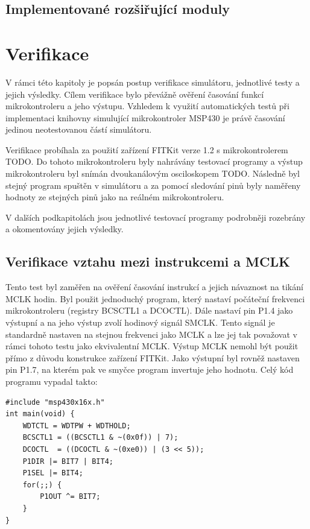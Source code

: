 \section{Implementované rozšiřující moduly}

\chapter{Verifikace}

V rámci této kapitoly je popsán postup verifikace simulátoru, jednotlivé testy a jejich výsledky. Cílem verifikace bylo převážně ověření časování funkcí mikrokontroleru a jeho výstupu. Vzhledem k využití automatických testů při implementaci knihovny simulující mikrokontroler MSP430 je právě časování jedinou neotestovanou částí simulátoru.

Verifikace probíhala za použití zařízení FITKit verze 1.2 s mikrokontrolerem TODO. Do tohoto mikrokontroleru byly nahrávány testovací programy a výstup mikrokontroleru byl snímán dvoukanálovým osciloskopem TODO. Následně byl stejný program spuštěn v simulátoru a za pomocí sledování pinů byly naměřeny hodnoty ze stejných pinů jako na reálném mikrokontroleru.

V dalších podkapitolách jsou jednotlivé testovací programy podrobněji rozebrány a okomentovány jejich výsledky.

\section{Verifikace vztahu mezi instrukcemi a MCLK}

Tento test byl zaměřen na ověření časování instrukcí a jejich návaznost na tikání MCLK hodin. Byl použit jednoduchý program, který nastaví počáteční frekvenci mikrokontroleru (registry BCSCTL1 a DCOCTL). Dále nastaví pin P1.4 jako výstupní a na jeho výstup zvolí hodinový signál SMCLK. Tento signál je standardně nastaven na stejnou frekvenci jako MCLK a lze jej tak považovat v rámci tohoto testu jako ekvivalentní MCLK. Výstup MCLK nemohl být použit přímo z důvodu konstrukce zařízení FITKit. Jako výstupní byl rovněž nastaven pin P1.7, na kterém pak ve smyčce program invertuje jeho hodnotu. Celý kód programu vypadal takto:

\lstset{language=XML, numbers=left, frame=single, breaklines=true, tabsize=2, xleftmargin=20pt}
\begin{lstlisting}
#include "msp430x16x.h"
int main(void) {
	WDTCTL = WDTPW + WDTHOLD;
	BCSCTL1 = ((BCSCTL1 & ~(0x0f)) | 7);
	DCOCTL  = ((DCOCTL & ~(0xe0)) | (3 << 5));
	P1DIR |= BIT7 | BIT4;
	P1SEL |= BIT4;
	for(;;) {
		P1OUT ^= BIT7;
	}
}
\end{lstlisting}

